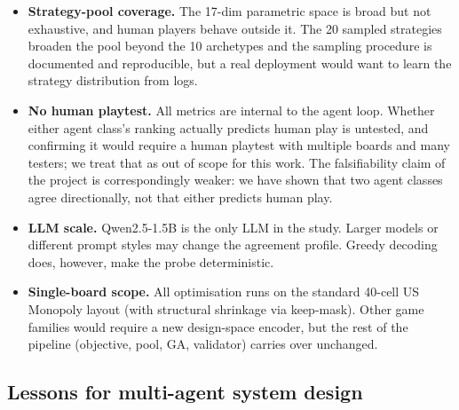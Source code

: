 \documentclass[10pt]{article}
\begin{document}
\begin{itemize}[leftmargin=1.2em,itemsep=1pt]
\item \textbf{Strategy-pool coverage.} The 17-dim parametric space is
broad but not exhaustive, and human players behave outside it. The 20
sampled strategies broaden the pool beyond the 10 archetypes and the
sampling procedure is documented and reproducible, but a real
deployment would want to learn the strategy distribution from logs.
\item \textbf{No human playtest.} All metrics are internal to the
agent loop. Whether either agent class's ranking actually predicts
human play is untested, and confirming it would require a human
playtest with multiple boards and many testers; we treat that as
out of scope for this work. The falsifiability claim of the
project is correspondingly weaker: we have shown that two agent
classes agree directionally, not that either predicts human play.
\item \textbf{LLM scale.} Qwen2.5-1.5B is the only LLM in the study.
Larger models or different prompt styles may change the agreement
profile. Greedy decoding does, however, make the probe deterministic.
\item \textbf{Single-board scope.} All optimisation runs on the
standard 40-cell US Monopoly layout (with structural shrinkage via
keep-mask). Other game families would require a new design-space
encoder, but the rest of the pipeline (objective, pool, GA,
validator) carries over unchanged.
\end{itemize}

\subsection{Lessons for multi-agent system design}\label{sec:lessons}
\end{document}
